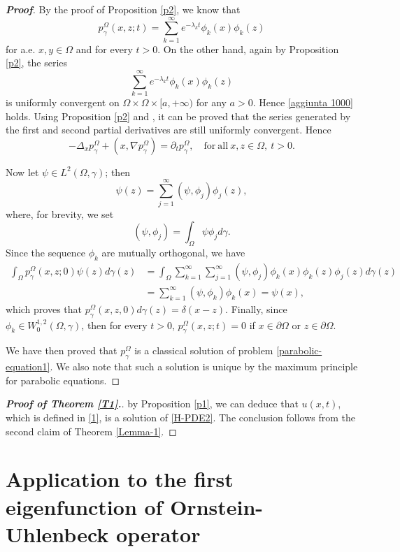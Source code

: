 \documentclass[12pt]{amsart}
\newcommand{\1}{\mathbf 1}
\begin{document}
\begin{proof}[\bf Proof]
By the proof of Proposition \ref{p2}, we know that
\[
p_\gamma^\Omega(x,z;t)=\mathop{\sum}_{k=1}^{\infty} e^{-\lambda_k t}\phi_k(x)\phi_k(z)
\]
for a.e. $x,y\in\Omega$ and for every $t>0$. On the other hand, again by Proposition \ref{p2}, the series
$$
\mathop{\sum}_{k=1}^{\infty} e^{-\lambda_k t}\phi_k(x)\phi_k(z)
$$
is uniformly convergent on $\Omega \times \Omega \times [a,+\infty)$ for any $a>0$. Hence \eqref{aggiunta 1000} holds. Using Proposition \ref{p2} and \cite[Theorem 6.2]{Book-Gilbarg-Trudinger}, it can be proved that the series generated by the first and second partial derivatives are still uniformly convergent. Hence
\begin{equation}\label{4-4}
-\Delta_x p_\gamma^\Omega+(x,\nabla p^\Omega_\gamma)=\partial_t p^\Omega_\gamma,\quad \mathrm{for\ all}\ x,z\in \Omega,\ t>0.
\end{equation}

Now let $\psi \in L^2(\Omega,\gamma)$; then
\[
\psi(z)=\mathop{\sum}^{\infty}_{j=1} (\psi, \phi_j)\phi_j(z),
\]
where, for brevity, we set
$$
(\psi, \phi_j)=\int_\Omega \psi\phi_j d\gamma.
$$
Since the sequence $\phi_k$ are mutually orthogonal, we have
 \begin{align*}
\int_\Omega p_\gamma^\Omega(x,z;0) \psi(z)d\gamma(z)&=\int_\Omega \sum_{k=1}^{\infty} \sum_{j=1}^{\infty}  (\psi, \phi_j) \phi_k(x) \phi_k(z)\phi_j(z)d\gamma(z)\\
&=\sum_{k=1}^{\infty}  (\psi, \phi_k)\phi_k(x)=\psi(x),
\end{align*}
which proves that $p_\gamma^\Omega(x,z,0)d\gamma(z)=\delta(x-z)$.
Finally, since $\phi_k\in W^{1,2}_0(\Omega,\gamma)$, then for every $t>0$, $p^\Omega_\gamma(x,z;t)=0$ if $x\in \partial \Omega$ or $z\in \partial \Omega$.

We have then proved that $p^\Omega_\gamma$ is a classical solution of problem \eqref{parabolic-equation1}. We also note that such a solution is unique by the maximum principle for parabolic equations.
\end{proof}


\begin{proof}[\bf Proof of Theorem \ref{T1}.]
by Proposition \ref{p1}, we can deduce that $u(x,t)$, which is defined in \eqref{1}, is a solution of \eqref{H-PDE2}. The conclusion follows from the second claim of Theorem \ref{Lemma-1}.
\end{proof}

\section{Application to the first eigenfunction of Ornstein-Uhlenbeck operator}\label{Se5}
\end{document}
